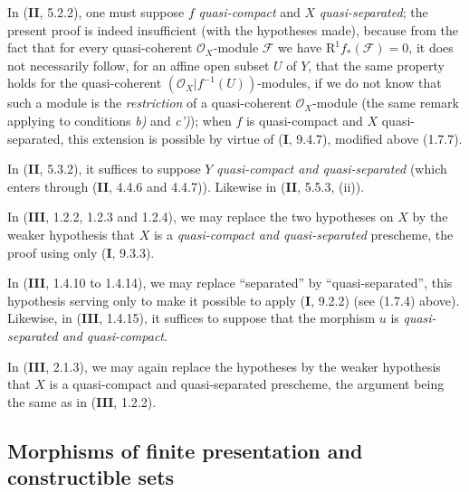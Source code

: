 \begin{env}[1.7.18]
\label{IV.1.7.18}
In (\textbf{II}, 5.2.2), one must suppose $f$ \emph{quasi-compact} and $X$ \emph{quasi-separated};
the present proof is indeed insufficient (with the hypotheses made),
because from the fact that for every quasi-coherent $\mathcal O_X$-module
$\mathscr F$ we have $\mathrm R^1f_*(\mathscr F)=0$, it does not necessarily
follow, for an affine open subset $U$ of $Y$, that the same property holds
for the quasi-coherent $(\mathcal O_X|f^{-1}(U))$-modules, if we do not know
that such a module is the \emph{restriction} of a quasi-coherent
$\mathcal O_X$-module (the same remark applying to conditions \emph{b)} and \emph{c')});
when $f$ is quasi-compact and $X$ quasi-separated, this extension is possible
by virtue of (\textbf{I}, 9.4.7), modified above (1.7.7).
\end{env}

\begin{env}[1.7.19]
\label{IV.1.7.19}
In (\textbf{II}, 5.3.2), it suffices to suppose $Y$ \emph{quasi-compact and
quasi-separated} (which enters through (\textbf{II}, 4.4.6 and 4.4.7)). Likewise in
(\textbf{II}, 5.5.3, (ii)).
\end{env}

\begin{env}[1.7.20]
\label{IV.1.7.20}
In (\textbf{III}, 1.2.2, 1.2.3 and 1.2.4), we may replace the two hypotheses on
$X$ by the weaker hypothesis that $X$ is a \emph{quasi-compact
and quasi-separated} prescheme, the proof using only (\textbf{I}, 9.3.3).
\end{env}

\begin{env}[1.7.21]
\label{IV.1.7.21}
In (\textbf{III}, 1.4.10 to 1.4.14), we may replace ``separated'' by
``quasi-separated'', this hypothesis serving only to make it possible to
apply (\textbf{I}, 9.2.2) (see (1.7.4) above). Likewise, in (\textbf{III}, 1.4.15), it
suffices to suppose that the morphism $u$ is \emph{quasi-separated and
quasi-compact}.
\end{env}

\begin{env}[1.7.22]
\label{IV.1.7.22}
In (\textbf{III}, 2.1.3), we may again replace the hypotheses by the weaker
hypothesis that $X$ is a quasi-compact and quasi-separated prescheme, the
argument being the same as in (\textbf{III}, 1.2.2).
\end{env}

\subsection{Morphisms of finite presentation and constructible sets}
\label{subsection:IV.1.8}

